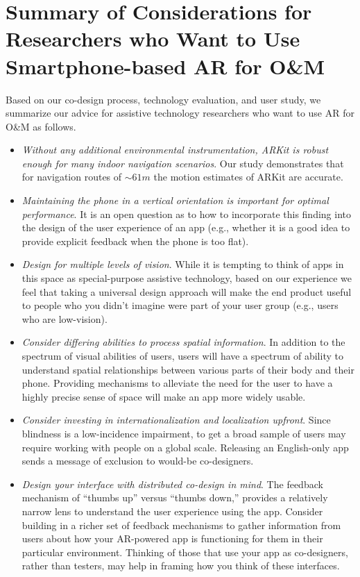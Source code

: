 \documentclass[chi]{sigchi}
\newcommand{\OM}{O\&M\xspace}
\begin{document}
\section{Summary of Considerations for Researchers who Want to Use Smartphone-based AR for \OM}

Based on our co-design process, technology evaluation, and user study, we summarize our advice for assistive technology researchers who want to use AR for \OM as follows.

\begin{itemize}
\item \emph{Without any additional environmental instrumentation, ARKit is robust enough for many indoor navigation scenarios}.  Our study demonstrates that for navigation routes of $\sim61m$ the motion estimates of ARKit are accurate.
\item \emph{Maintaining the phone in a vertical orientation is important for optimal performance}.  It is an open question as to how to incorporate this finding into the design of the user experience of an app (e.g., whether it is a good idea to provide explicit feedback when the phone is too flat).
\item \emph{Design for multiple levels of vision}.  While it is tempting to think of apps in this space as special-purpose assistive technology, based on our experience we feel that taking a universal design approach will make the end product useful to people who you didn't imagine were part of your user group (e.g., users who are low-vision).
\item \emph{Consider differing abilities to process spatial information}.  In addition to the spectrum of visual abilities of users, users will have a spectrum of ability to understand spatial relationships between various parts of their body and their phone.  Providing mechanisms to alleviate the need for the user to have a highly precise sense of space will make an app more widely usable.
\item \emph{Consider investing in internationalization and localization upfront}.  Since blindness is a low-incidence impairment, to get a broad sample of users may require working with people on a global scale.  Releasing an English-only app sends a message of exclusion to would-be co-designers.

\item \emph{Design your interface with distributed co-design in mind}.  The feedback mechanism of ``thumbs up'' versus ``thumbs down,'' provides a relatively narrow lens to understand the user experience using the app.  Consider building in a richer set of feedback mechanisms to gather information from users about how your AR-powered app is functioning for them in their particular environment.  Thinking of those that use your app as co-designers, rather than testers, may help in framing how you think of these interfaces.


\end{itemize}
\end{document}
